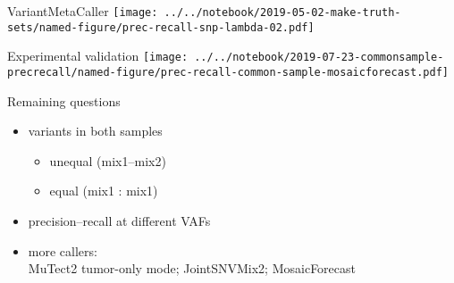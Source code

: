 \documentclass{beamer}
\begin{document}
\begin{frame}[plain]{VariantMetaCaller}
\texttt{[image: ../../notebook/2019-05-02-make-truth-sets/named-figure/prec-recall-snp-lambda-02.pdf]}
\end{frame}


\begin{frame}{Experimental validation}
\texttt{[image: ../../notebook/2019-07-23-commonsample-precrecall/named-figure/prec-recall-common-sample-mosaicforecast.pdf]}
\end{frame}

\begin{frame}{Remaining questions}
\begin{itemize}
\item variants in both samples
\begin{itemize}
\item unequal (mix1--mix2)
\item equal (mix1 : mix1)
\end{itemize}
\item precision--recall at different VAFs
\item more callers:\\MuTect2 tumor-only mode; JointSNVMix2; MosaicForecast
\end{itemize}
\end{frame}
\end{document}
